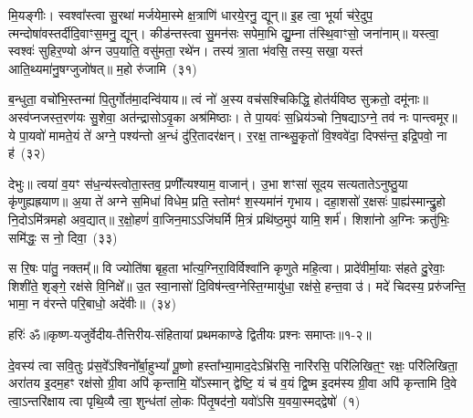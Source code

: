 मि॒यङ्गीः। स्वश्वा᳚स्त्वा सु॒रथा॑ मर्जयेमा॒स्मे क्ष॒त्राणि॑ धारये॒रनु॒ द्यून्॥ इ॒ह त्वा॒ भूर्या च॑रे॒दुप॒ त्मन्दोषा॑वस्तर्दीदि॒वाꣳ\-स॒मनु॒ द्यून्। कीड॑न्तस्त्वा सु॒मन॑सः सपेमा॒भि द्यु॒म्ना त॑स्थि॒वाꣳसो॒ जना॑नाम्॥ यस्त्वा॒ स्वश्वः॑ सुहिर॒ण्यो अ॑ग्न उप॒याति॒ वसु॑मता॒ रथे॑न। तस्य॑ त्रा॒ता भ॑वसि॒ तस्य॒ सखा॒ यस्त॑ आति॒थ्यमा॑नु॒षग्जुजो॑षत्॥ म॒हो रु॑जामि~(३१)

ब॒न्धुता॒ वचो॑भि॒स्तन्मा॑ पि॒तुर्गोत॑मा॒दन्वि॑याय॥ त्वं नो॑ अ॒स्य वच॑सश्चिकिद्धि॒ होत॑र्यविष्ठ सुक्रतो॒ दमू॑नाः॥ अस्व॑प्नजस्त॒रण॑यः सु॒शेवा॒ अत॑न्द्रासो\-ऽवृ॒का अश्र॑मिष्ठाः। ते पा॒यवः॑ स॒ध्रिय॑ञ्चो नि॒षद्या\-ऽग्ने॒ तव॑ नः पान्त्वमूर॥ ये पा॒यवो॑ मामते॒यं ते॑ अग्ने॒ पश्य॑न्तो अ॒न्धं दु॑रि॒तादर॑क्षन्। र॒रक्ष॒ तान्थ्सु॒कृतो॑ वि॒श्ववे॑दा॒ दिफ्स॑न्त॒ इद्रि॒पवो॒ ना ह॑~(३२)

देभुः॥ त्वया॑ व॒यꣳ स॑ध॒न्य॑स्त्वोता॒स्तव॒ प्रणी᳚त्यश्याम॒ वाजान्॑। उ॒भा शꣳसा॑ सूदय सत्यताते\-ऽनुष्ठु॒या कृ॑णुह्यह्रयाण॥ अ॒या ते॑ अग्ने स॒मिधा॑ विधेम॒ प्रति॒ स्तोमꣳ॑ श॒स्यमा॑नं गृभाय। दहा॒शसो॑ र॒क्षसः॑ पा॒ह्य॑स्मान्द्रु॒हो नि॒दो\-ऽमि॑त्रमहो अव॒द्यात्॥ र॒क्षो॒हणं॑ वा॒जिन॒मा\-ऽऽ\-जि॑घर्मि मि॒त्रं प्रथि॑ष्ठ॒मुप॑ यामि॒ शर्म॑। शिशा॑नो अ॒ग्निः क्रतु॑भिः॒ समि॑द्धः॒ स नो॒ दिवा॒~(३३)

स रि॒षः पा॑तु॒ नक्तम्᳚॥ वि ज्योति॑षा बृह॒ता भा᳚त्य॒ग्निरा॒विर्विश्वा॑नि कृणुते महि॒त्वा। प्रादे॑वीर्मा॒याः स॑हते दु॒रेवाः॒ शिशी॑ते॒ शृङ्गे॒ रक्ष॑से वि॒निक्षे᳚॥ उ॒त स्वा॒नासो॑ दि॒विष॑न्त्व॒ग्नेस्ति॒ग्मायु॑धा॒ रक्ष॑से॒ हन्त॒वा उ॑। मदे॑ चिदस्य॒ प्ररु॑जन्ति॒ भामा॒ न व॑रन्ते परि॒बाधो॒ अदे॑वीः॥~(३४)

{}

{हरिः॑ ॐ}{॥कृष्ण-यजुर्वेदीय-तैत्तिरीय-संहितायां प्रथमकाण्डे द्वितीयः प्रश्नः समाप्तः॥१-२॥}

\setcounter{anuvakam}{0}
दे॒वस्य॑ त्वा सवि॒तुः प्र॑स॒वे᳚\-ऽश्विनो᳚र्बा॒हु\-भ्यां᳚ पू॒ष्णो हस्ता᳚भ्या॒माद॒दे\-ऽभ्रि॑रसि॒ नारि॑रसि॒ परि॑लिखित॒ꣳ॒ रक्षः॒ परि॑लिखिता॒ अरा॑तय इ॒दम॒हꣳ रक्ष॑सो ग्री॒वा अपि॑ कृन्तामि॒ यो᳚\-ऽस्मान् द्वेष्टि॒ यं च॑ व॒यं द्वि॒ष्म इ॒दम॑स्य ग्री॒वा अपि॑ कृन्तामि दि॒वे त्वा॒\-ऽन्तरि॑क्षाय त्वा पृथि॒व्यै त्वा॒ शुन्ध॑तां लो॒कः पि॑तृ॒षद॑नो॒ यवो॑\-ऽसि य॒वया॒स्मद्द्वेषो॑~(१)

